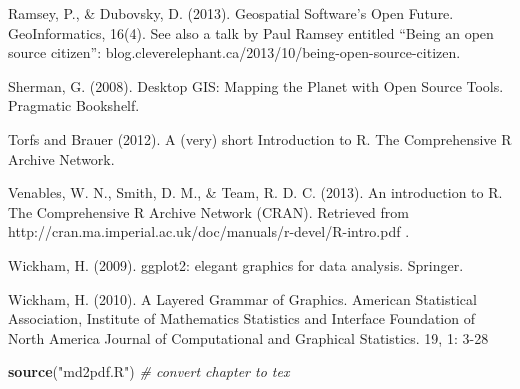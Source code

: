 \documentclass[]{article}
\newenvironment{Shaded}{}{}
\newcommand{\KeywordTok}[1]{\textcolor[rgb]{0.00,0.44,0.13}{\textbf{{#1}}}}
\newcommand{\StringTok}[1]{\textcolor[rgb]{0.25,0.44,0.63}{{#1}}}
\newcommand{\CommentTok}[1]{\textcolor[rgb]{0.38,0.63,0.69}{\textit{{#1}}}}
\newcommand{\NormalTok}[1]{{#1}}
\begin{document}
Ramsey, P., \& Dubovsky, D. (2013). Geospatial Software's Open Future.
GeoInformatics, 16(4). See also a talk by Paul Ramsey entitled ``Being
an open source citizen'':
blog.cleverelephant.ca/2013/10/being-open-source-citizen.

Sherman, G. (2008). Desktop GIS: Mapping the Planet with Open Source
Tools. Pragmatic Bookshelf.

Torfs and Brauer (2012). A (very) short Introduction to R. The
Comprehensive R Archive Network.

Venables, W. N., Smith, D. M., \& Team, R. D. C. (2013). An introduction
to R. The Comprehensive R Archive Network (CRAN). Retrieved from
http://cran.ma.imperial.ac.uk/doc/manuals/r-devel/R-intro.pdf .

Wickham, H. (2009). ggplot2: elegant graphics for data analysis.
Springer.

Wickham, H. (2010). A Layered Grammar of Graphics. American Statistical
Association, Institute of Mathematics Statistics and Interface
Foundation of North America Journal of Computational and Graphical
Statistics. 19, 1: 3-28

\begin{Shaded}
\begin{Highlighting}[]
\KeywordTok{source}\NormalTok{(}\StringTok{"md2pdf.R"}\NormalTok{)  }\CommentTok{# convert chapter to tex}
\end{Highlighting}
\end{Shaded}
\end{document}

